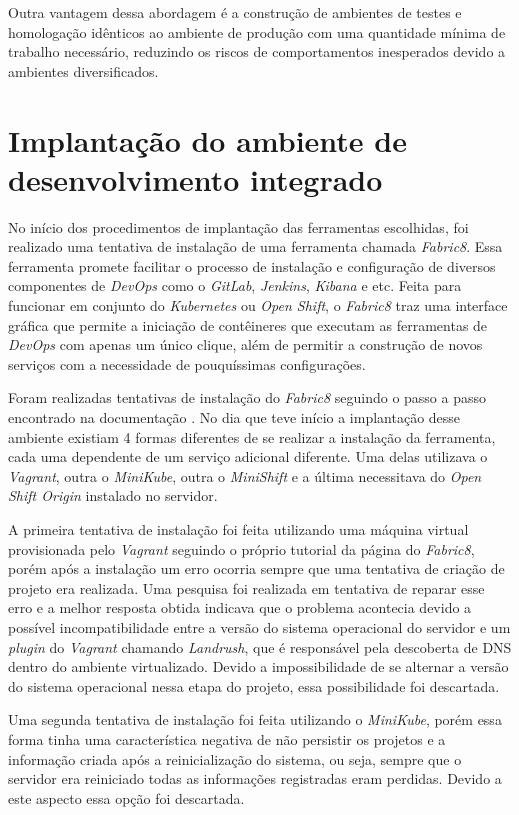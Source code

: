 \documentclass[
	12pt,				%
	openright,			%
	oneside,			%
	a4paper,			%
	english,			%
	french,				%
	spanish,			%
	brazil,				%
	]{abntex2}
\begin{document}
Outra vantagem dessa abordagem é a construção de ambientes de testes e homologação idênticos ao ambiente de produção com uma quantidade mínima de trabalho necessário, reduzindo os riscos de comportamentos inesperados devido a ambientes diversificados.

\section{Implantação do ambiente de desenvolvimento integrado}

No início dos procedimentos de implantação das ferramentas escolhidas, foi realizado uma tentativa de instalação de uma ferramenta chamada \textit{Fabric8}. Essa ferramenta promete facilitar o processo de instalação e configuração de diversos componentes de \textit{DevOps} como o \textit{GitLab}, \textit{Jenkins}, \textit{Kibana} e etc. Feita para funcionar em conjunto do \textit{Kubernetes} ou \textit{Open Shift}, o \textit{Fabric8} traz uma interface gráfica que permite a iniciação de contêineres que executam as ferramentas de \textit{DevOps} com apenas um único clique, além de permitir a construção de novos serviços com a necessidade de pouquíssimas configurações.

Foram realizadas tentativas de instalação do \textit{Fabric8} seguindo o passo a passo encontrado na documentação \cite{Fabric8:Docs}. No dia que teve início a implantação desse ambiente existiam 4 formas diferentes de se realizar a instalação da ferramenta, cada uma dependente de um serviço adicional diferente. Uma delas utilizava o \textit{Vagrant}, outra o \textit{MiniKube}, outra o \textit{MiniShift} e a última necessitava do \textit{Open Shift Origin} instalado no servidor.

A primeira tentativa de instalação foi feita utilizando uma máquina virtual provisionada pelo \textit{Vagrant} seguindo o próprio tutorial da página do \textit{Fabric8}, porém após a instalação um erro ocorria sempre que uma tentativa de criação de projeto era realizada. Uma pesquisa foi realizada em tentativa de reparar esse erro e a melhor resposta obtida indicava que o problema acontecia devido a possível incompatibilidade entre a versão do sistema operacional do servidor e um \textit{plugin} do \textit{Vagrant} chamando \textit{Landrush}, que é responsável pela descoberta de DNS dentro do ambiente virtualizado. Devido a impossibilidade de se alternar a versão do sistema operacional nessa etapa do projeto, essa possibilidade foi descartada.

Uma segunda tentativa de instalação foi feita utilizando o \textit{MiniKube}, porém essa forma tinha uma característica negativa de não persistir os projetos e a informação criada após a reinicialização do sistema, ou seja, sempre que o servidor era reiniciado todas as informações registradas eram perdidas. Devido a este aspecto essa opção foi descartada.
\end{document}
